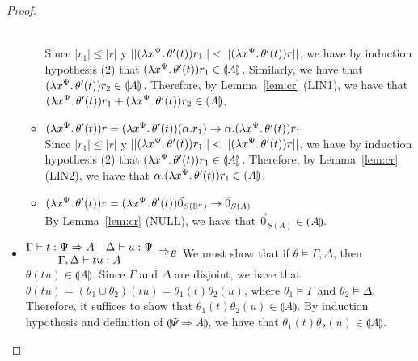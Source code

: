 \documentclass[preprint]{elsarticle}
\newcommand\interp[1]{\llparenthesis #1\rrparenthesis}
\newcommand\size[1]{||#1||}
\newcommand\lpl[1]{|#1|}
\newcommand\B{\ensuremath{\mathbb B}}
\newcommand\z[1][A]{\vec 0_{S(#1)}}
\newcommand\nullvec[1]{\z[#1]}
\newcommand{\app}[2]{#1 #2}
\newcommand{\reducesto}{\rightarrow}
\newcommand{\vrbl}[2]{#1^{#2}}
\newcommand{\abstr}[2]{\lambda#1\ldotp#2}
\begin{document}
\begin{proof}
\begin{itemize}
\begin{itemize}
      \\ Since \( \lpl{r_1} \leq \lpl{r} \) y \( \size{\app{(\abstr{\vrbl{x}{\Psi}}{\theta'(t)})}{r_1}} < \size{\app{(\abstr{\vrbl{x}{\Psi}}{\theta'(t)})}{r}} \), we have by induction hypothesis (2) that \( \app{(\abstr{\vrbl{x}{\Psi}}{\theta'(t)})}{r_1} \in \interp{A} \). Similarly, we have that \( \app{(\abstr{\vrbl{x}{\Psi}}{\theta'(t)})}{r_2} \in \interp{A} \). Therefore, by Lemma~\ref{lem:cr} (LIN1), we have that \( \app{(\abstr{\vrbl{x}{\Psi}}{\theta'(t)})}{r_1} + \app{(\abstr{\vrbl{x}{\Psi}}{\theta'(t)})}{r_2} \in \interp{A} \).
    \item \( \app{(\abstr{\vrbl{x}{\Psi}}{\theta'(t)})}{r} = \app{(\abstr{\vrbl{x}{\Psi}}{\theta'(t)})}{(\alpha . r_1)} \reducesto \alpha . \app{(\abstr{\vrbl{x}{\Psi}}{\theta'(t)})}{r_1} \)
      \\ Since \( \lpl{r_1} \leq \lpl{r} \) y \( \size{\app{(\abstr{\vrbl{x}{\Psi}}{\theta'(t)})}{r_1}} < \size{\app{(\abstr{\vrbl{x}{\Psi}}{\theta'(t)})}{r}} \), we have by induction hypothesis (2) that \( \app{(\abstr{\vrbl{x}{\Psi}}{\theta'(t)})}{r_1} \in \interp{A} \). Therefore, by Lemma~\ref{lem:cr} (LIN2), we have that \( \alpha . \app{(\abstr{\vrbl{x}{\Psi}}{\theta'(t)})}{r_1} \in \interp{A} \).
    \item \( \app{(\abstr{\vrbl{x}{\Psi}}{\theta'(t)})}{r} = \app{(\abstr{\vrbl{x}{\Psi}}{\theta'(t)})}{\nullvec{\B^n}} \reducesto \nullvec{A} \)
      \\ By Lemma~\ref{lem:cr} (NULL), we have that \( \nullvec{A} \in \interp{A} \).
    \end{itemize}

  \item \( \vcenter{\infer[\Rightarrow_E]{\Gamma, \Delta \vdash {t}{u} :
        A}{\Gamma \vdash t : \Psi \Rightarrow A & \Delta \vdash u : \Psi}} \) We must show that if \( \theta \models \Gamma, \Delta \), then \( \theta(\app{t}{u}) \in \interp{A} \).
    Since \( \Gamma \) and \( \Delta \) are disjoint, we have that \( \theta(\app{t}{u}) = (\theta_1 \cup \theta_2)(\app{t}{u}) = \app{\theta_1(t)}{\theta_2(u)} \), where \( \theta_1 \models \Gamma \) and \( \theta_2 \models \Delta \).
    Therefore, it suffices to show that \( \app{\theta_1(t)}{\theta_2(u)} \in \interp{A} \).
    By induction hypothesis and definition of \( \interp{\Psi \Rightarrow A} \), we have that \( \app{\theta_1(t)}{\theta_2(u)} \in \interp{A} \).


\end{itemize}
\end{proof}
\end{document}
